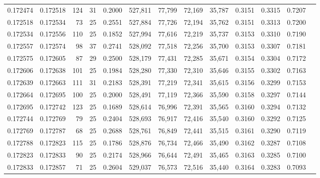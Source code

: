\begin{tabular}{rrrrrrrrrrrrr}
0.172474 & 0.172518 & 124 &  31 &                                     0.2000 & 527,811 &  77,799 &  72,169 &  35,787 & 0.3151 & 0.3315 & 0.7207 \\
0.172518 & 0.172534 &  73 &  25 &                                     0.2551 & 527,884 &  77,726 &  72,194 &  35,762 & 0.3151 & 0.3313 & 0.7200 \\
0.172534 & 0.172556 & 110 &  25 &                                     0.1852 & 527,994 &  77,616 &  72,219 &  35,737 & 0.3153 & 0.3310 & 0.7190 \\
0.172557 & 0.172574 &  98 &  37 &                                     0.2741 & 528,092 &  77,518 &  72,256 &  35,700 & 0.3153 & 0.3307 & 0.7181 \\
0.172575 & 0.172605 &  87 &  29 &                                     0.2500 & 528,179 &  77,431 &  72,285 &  35,671 & 0.3154 & 0.3304 & 0.7172 \\
0.172606 & 0.172638 & 101 &  25 &                                     0.1984 & 528,280 &  77,330 &  72,310 &  35,646 & 0.3155 & 0.3302 & 0.7163 \\
0.172639 & 0.172663 & 111 &  31 &                                     0.2183 & 528,391 &  77,219 &  72,341 &  35,615 & 0.3156 & 0.3299 & 0.7153 \\
0.172664 & 0.172695 & 100 &  25 &                                     0.2000 & 528,491 &  77,119 &  72,366 &  35,590 & 0.3158 & 0.3297 & 0.7144 \\
0.172695 & 0.172742 & 123 &  25 &                                     0.1689 & 528,614 &  76,996 &  72,391 &  35,565 & 0.3160 & 0.3294 & 0.7132 \\
0.172744 & 0.172769 &  79 &  25 &                                     0.2404 & 528,693 &  76,917 &  72,416 &  35,540 & 0.3160 & 0.3292 & 0.7125 \\
0.172769 & 0.172787 &  68 &  25 &                                     0.2688 & 528,761 &  76,849 &  72,441 &  35,515 & 0.3161 & 0.3290 & 0.7119 \\
0.172788 & 0.172823 & 115 &  25 &                                     0.1786 & 528,876 &  76,734 &  72,466 &  35,490 & 0.3162 & 0.3287 & 0.7108 \\
0.172823 & 0.172833 &  90 &  25 &                                     0.2174 & 528,966 &  76,644 &  72,491 &  35,465 & 0.3163 & 0.3285 & 0.7100 \\
0.172833 & 0.172857 &  71 &  25 &                                     0.2604 & 529,037 &  76,573 &  72,516 &  35,440 & 0.3164 & 0.3283 & 0.7093 \\

\end{tabular}
